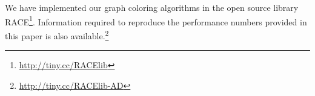 \begin{itemize}
\end{itemize}
We have implemented our graph coloring algorithms in the open source library \acrfull{RACE}\footnote{\href{http://tiny.cc/RACElib}{http://tiny.cc/RACElib}}. 
Information required to reproduce the performance numbers provided in this 
paper is also available.\footnote{\href{http://tiny.cc/RACElib-AD}{http://tiny.cc/RACElib-AD}}


